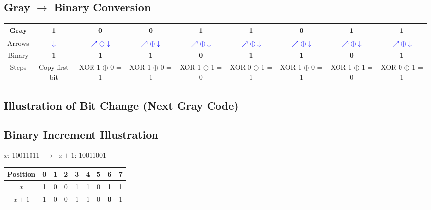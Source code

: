 \subsection*{Gray $\to$ Binary Conversion}

 \begin{center}
\renewcommand{\arraystretch}{1.3}
\begin{tabular}{|c|*8{c|}}
  \hline
    Gray &
    1 &    0 &    0 &    1 &    1 &    0 &    1 &    1  \\
  \hline

  Arrows &
      \textcolor{blue}{$\downarrow$} &
        \textcolor{blue}{$\nearrow \oplus \downarrow$} &        \textcolor{blue}{$\nearrow \oplus \downarrow$} &        \textcolor{blue}{$\nearrow \oplus \downarrow$} &        \textcolor{blue}{$\nearrow \oplus \downarrow$} &        \textcolor{blue}{$\nearrow \oplus \downarrow$} &        \textcolor{blue}{$\nearrow \oplus \downarrow$} &        \textcolor{blue}{$\nearrow \oplus \downarrow$}  \\
  \hline

    Binary &
    \textbf{ 1 } &    \textbf{ 1 } &    \textbf{ 1 } &    \textbf{ 0 } &    \textbf{ 1 } &    \textbf{ 1 } &    \textbf{ 0 } &    \textbf{ 1 }  \\
  \hline

  Steps &
    {\scriptsize Copy first bit } &    {\scriptsize XOR 1 $\oplus$ 0 = 1 } &    {\scriptsize XOR 1 $\oplus$ 0 = 1 } &    {\scriptsize XOR 1 $\oplus$ 1 = 0 } &    {\scriptsize XOR 0 $\oplus$ 1 = 1 } &    {\scriptsize XOR 1 $\oplus$ 0 = 1 } &    {\scriptsize XOR 1 $\oplus$ 1 = 0 } &    {\scriptsize XOR 0 $\oplus$ 1 = 1 }  \\
  \hline
\end{tabular}
\end{center}


\bigskip

\subsection*{Illustration of Bit Change (Next Gray Code)}
\subsection*{Binary Increment Illustration}

$x$: 10011011 $\;\to\;$ $x+1$: 10011001

\begin{tabular}{|c|*8{c|}}
\hline
Position &  0 &  1 &  2 &  3 &  4 &  5 &  6 &  7   \\
\hline
$x$ &  1 &  0 &  0 &  1 &  1 &  0 &  1 &  1   \\
\hline
$x+1$ &     1
&    0
&    0
&    1
&    1
&    0
&    \cellcolor{yellow}\textbf{ 0 }
&    1
 \\
\hline
\end{tabular}


